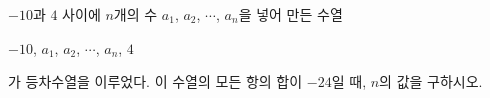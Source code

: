 $-10$과 $4$ 사이에 $n$개의 수 $a_1$, $a_2$, $\cdots$, $a_n$을 넣어 만든 수열 \par\smallskip\noindent\hspace*{1.5em}$-10$, $a_1$, $a_2$, $\cdots$, $a_n$, $4$\par\smallskip\noindent 가 등차수열을 이루었다. 이 수열의 모든 항의 합이 $-24$일 때, $n$의 값을 구하시오.
